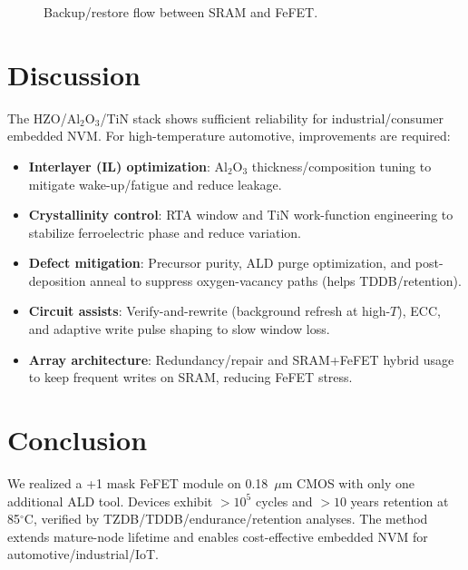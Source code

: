 \documentclass[conference]{IEEEtran}
\begin{document}
\begin{figure}[!t]
  \centering
  \caption{Backup/restore flow between SRAM and FeFET.}
  \label{fig:backup_flow}
\end{figure}

\section{Discussion}
The HZO/Al$_2$O$_3$/TiN stack shows sufficient reliability for industrial/consumer embedded NVM.
For high-temperature automotive, improvements are required:
\begin{itemize}
  \item \textbf{Interlayer (IL) optimization}: Al$_2$O$_3$ thickness/composition tuning to mitigate wake-up/fatigue and reduce leakage.
  \item \textbf{Crystallinity control}: RTA window and TiN work-function engineering to stabilize ferroelectric phase and reduce variation.
  \item \textbf{Defect mitigation}: Precursor purity, ALD purge optimization, and post-deposition anneal to suppress oxygen-vacancy paths (helps TDDB/retention).
  \item \textbf{Circuit assists}: Verify-and-rewrite (background refresh at high-$T$), ECC, and adaptive write pulse shaping to slow window loss.
  \item \textbf{Array architecture}: Redundancy/repair and SRAM+FeFET hybrid usage to keep frequent writes on SRAM, reducing FeFET stress.
\end{itemize}

\section{Conclusion}
We realized a +1 mask FeFET module on 0.18~$\mu$m CMOS with only one additional ALD tool.
Devices exhibit $>10^5$ cycles and $>10$ years retention at 85$^\circ$C, verified by TZDB/TDDB/endurance/retention analyses.
The method extends mature-node lifetime and enables cost-effective embedded NVM for automotive/industrial/IoT.
\end{document}
